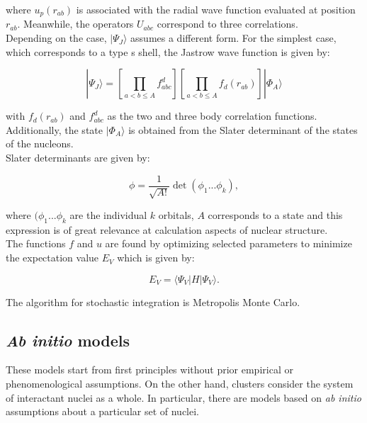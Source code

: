 \documentclass[openany]{book}
\begin{document}
where $u_{p}(r_{ab})$ is associated with the radial wave function evaluated at position $r_{ab}$. Meanwhile, the operators $U_{abc}$ correspond to three correlations.  \\

Depending on the case, $|\Psi_J \rangle$ assumes a different form. For the simplest case, which corresponds to a type s shell, the Jastrow wave function is given by:


\begin{equation}\label{eq:micro_modernTheories_variationalMonteCarlo_Jastrow}
	| \Psi_J \rangle  = \left[ \prod_{a < b \le A }{f^{d}_{abc}} \right] \left[ \prod_{a < b \le A }{f_d(r_{ab})} \right] |\Phi_A \rangle
\end{equation}

with $f_d(r_{ab})$ and $f^{d}_{abc}$ as the two and three body correlation functions. Additionally, the state $|\Phi_A \rangle$ is obtained from the Slater determinant of the states of the nucleons.  \\

Slater determinants are given by: 

\begin{equation} \label{eq:micro_slatter}
	\phi = \frac{1}{\sqrt{A!}} \det{(\phi_1 ... \phi_k)},
\end{equation}

where $(\phi_1 ... \phi_k$ are the individual $k$ orbitals, $A$ corresponds to a state and this expression is of great relevance at calculation aspects of nuclear structure. \\

The functions $f$ and $u$ are found by optimizing selected parameters to minimize the expectation value $E_V$ which is given by:

\begin{equation}\label{eq:micro_modernTheories_expectationValue}
	E_V = \langle \Psi_V | H | \Psi_V \rangle.
\end{equation}

The algorithm for stochastic integration is Metropolis Monte Carlo. \\



\subsection{\textit{Ab initio} models} \label{sub:microscopical_abinitio}

These models start from first principles without prior empirical or phenomenological assumptions. 
On the other hand, clusters consider the system of interactant nuclei as a whole. In particular, there are models based on \textit{ab initio} assumptions about a particular set of nuclei.  \\
 
\end{document}
